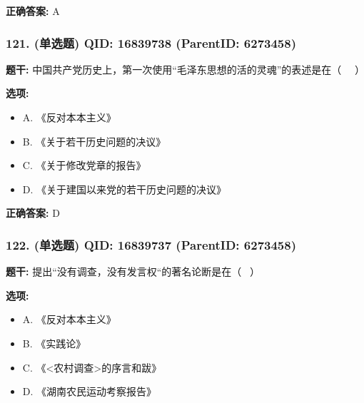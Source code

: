 \documentclass[12pt,UTF8]{ctexart}
\begin{document}
\textbf{正确答案:}
A

\vspace{0.3em}\hrulefill\vspace{0.7em}

\subsubsection*{121. (单选题) \small QID: 16839738 (ParentID: 6273458)}

\textbf{题干:}
中国共产党历史上，第一次使用“毛泽东思想的活的灵魂”的表述是在（   ）



\textbf{选项:}
\begin{itemize}[leftmargin=*]

  \item A. 《反对本本主义》

  \item B. 《关于若干历史问题的决议》

  \item C. 《关于修改党章的报告》

  \item D. 《关于建国以来党的若干历史问题的决议》

\end{itemize}

\textbf{正确答案:}
D

\vspace{0.3em}\hrulefill\vspace{0.7em}

\subsubsection*{122. (单选题) \small QID: 16839737 (ParentID: 6273458)}

\textbf{题干:}
提出“没有调查，没有发言权“的著名论断是在（  ）



\textbf{选项:}
\begin{itemize}[leftmargin=*]

  \item A. 《反对本本主义》

  \item B. 《实践论》

  \item C. 《<农村调查>的序言和跋》

  \item D. 《湖南农民运动考察报告》

\end{itemize}
\end{document}
